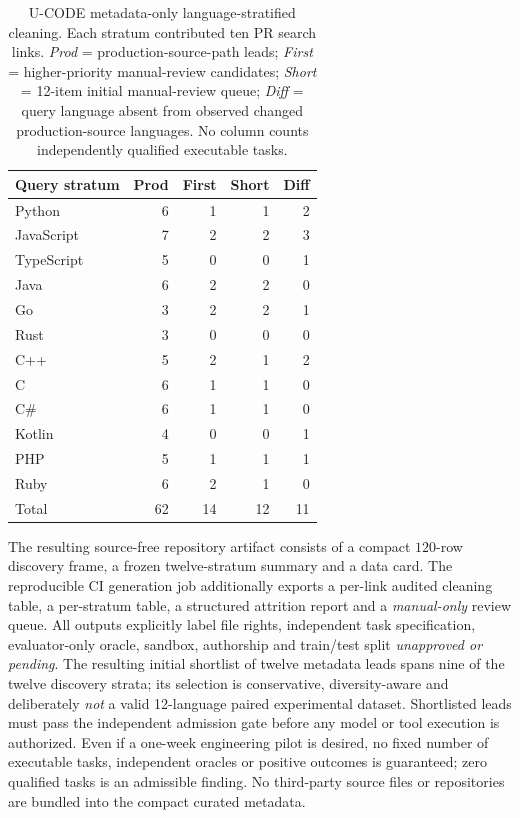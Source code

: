 \documentclass[pdflatex,sn-basic]{sn-jnl}
\begin{document}
\begin{table}[t]
\centering
\caption{U-CODE metadata-only language-stratified cleaning.
Each stratum contributed ten PR search links.
\emph{Prod} = production-source-path leads;
\emph{First} = higher-priority manual-review candidates;
\emph{Short} = 12-item initial manual-review queue;
\emph{Diff} = query language absent from observed changed
production-source languages. No column counts independently
qualified executable tasks.}
\label{tab:curation-languages}
\scriptsize
\begin{tabular}{lrrrr}
\toprule
Query stratum & Prod & First & Short & Diff\\
\midrule
Python & 6 & 1 & 1 & 2\\
JavaScript & 7 & 2 & 2 & 3\\
TypeScript & 5 & 0 & 0 & 1\\
Java & 6 & 2 & 2 & 0\\
Go & 3 & 2 & 2 & 1\\
Rust & 3 & 0 & 0 & 0\\
C++ & 5 & 2 & 1 & 2\\
C & 6 & 1 & 1 & 0\\
C\# & 6 & 1 & 1 & 0\\
Kotlin & 4 & 0 & 0 & 1\\
PHP & 5 & 1 & 1 & 1\\
Ruby & 6 & 2 & 1 & 0\\
\midrule
Total & 62 & 14 & 12 & 11\\
\bottomrule
\end{tabular}
\end{table}

The resulting source-free repository artifact consists
of a compact $120$-row discovery frame, a frozen
twelve-stratum summary and a data card.
The reproducible CI generation job additionally
exports a per-link audited cleaning table, a
per-stratum table, a structured attrition report
and a \emph{manual-only} review queue.
All outputs explicitly label file rights, independent
task specification, evaluator-only oracle,
sandbox, authorship and train/test split
\emph{unapproved or pending}. The resulting
initial shortlist of twelve metadata leads
spans nine of the twelve discovery strata;
its selection is conservative, diversity-aware
and deliberately \emph{not} a valid 12-language
paired experimental dataset. Shortlisted leads
must pass the independent admission gate
before any model or tool execution is authorized.
Even if a one-week engineering pilot is desired,
no fixed number of executable tasks, independent
oracles or positive outcomes is guaranteed;
zero qualified tasks is an admissible finding.
No third-party source files or repositories are
bundled into the compact curated metadata.
\end{document}
